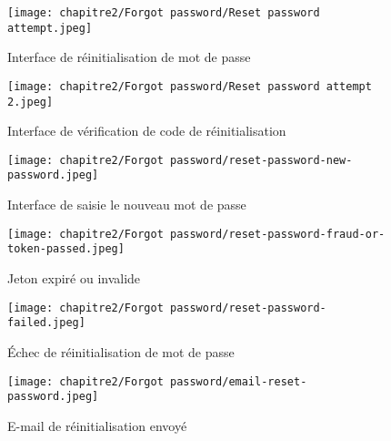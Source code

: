 \begin{figure}[H]
  \centering

  \begin{minipage}[t]{0.45\textwidth}
    \centering
    \texttt{[image: chapitre2/Forgot password/Reset password attempt.jpeg]}
    \caption{Interface de réinitialisation de mot de passe}
    \label{fig:3.40}
  \end{minipage}
  \hspace{1cm}
  \begin{minipage}[t]{0.45\textwidth}
    \centering
    \texttt{[image: chapitre2/Forgot password/Reset password attempt 2.jpeg]}
    \caption{Interface de vérification de code de réinitialisation}
    \label{fig:3.41}

  \end{minipage}

  \vspace{0.5cm}
  \begin{minipage}[t]{0.45\textwidth}
    \centering
    \texttt{[image: chapitre2/Forgot password/reset-password-new-password.jpeg]}
    \caption{Interface de saisie le nouveau mot de passe}
    \label{fig:3.42}
  \end{minipage}
  \hspace{1cm}
  \begin{minipage}[t]{0.45\textwidth}
    \centering
    \texttt{[image: chapitre2/Forgot password/reset-password-fraud-or-token-passed.jpeg]}
    \caption{Jeton expiré ou invalide}
    \label{fig:3.43}
  \end{minipage}


\end{figure}
\begin{figure}[H]
  \centering

  \begin{minipage}[t]{0.45\textwidth}
    \vspace*{0pt} %
    \centering
    \texttt{[image: chapitre2/Forgot password/reset-password-failed.jpeg]}
    \label{fig:3.44}
    \caption{Échec de réinitialisation de mot de passe}
  \end{minipage}
  \hspace{1cm}
  \begin{minipage}[t]{0.45\textwidth}
    \vspace*{0pt} %
    \centering
    \texttt{[image: chapitre2/Forgot password/email-reset-password.jpeg]}
    \caption{E-mail de réinitialisation envoyé}
    \label{fig:3.45}
  \end{minipage}

\end{figure}


